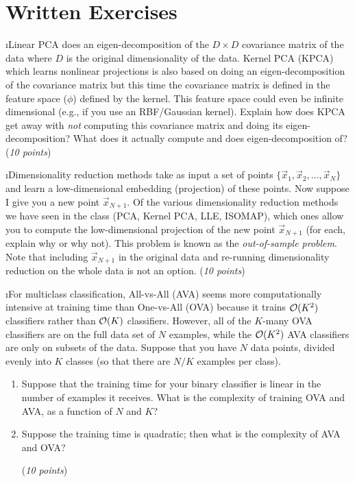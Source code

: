 \documentclass[fleqn]{article}
\begin{document}

\section{Written Exercises}

\bee

\i Linear PCA does an eigen-decomposition of the $D\times D$ covariance
matrix of the data where $D$ is the original dimensionality of the data.
Kernel PCA (KPCA) which learns nonlinear projections is also based on doing an
eigen-decomposition of the covariance matrix but this time the covariance
matrix is defined in the feature space ($\phi$) defined by the kernel. This 
feature space could even be infinite dimensional (e.g., if you use an 
RBF/Gaussian kernel). Explain how does KPCA get away with \emph{not} computing
this covariance matrix and doing its eigen-decomposition? What does it
actually compute and does eigen-decomposition of? (\emph{10 points})

\i Dimensionality reduction methods take as input a set of points
$\{\vec{x}_1,\vec{x}_2,\ldots,\vec{x}_N\}$ and learn a low-dimensional
embedding (projection) of these points. Now suppose I give you a new point
$\vec{x}_{N+1}$. Of the various dimensionality reduction methods we 
have seen in the class (PCA, Kernel PCA, LLE, ISOMAP), which ones 
allow you to compute the low-dimensional projection of the new point
$\vec{x}_{N+1}$ (for each, explain why or why not). This problem is known
as the \emph{out-of-sample problem}. Note that including $\vec{x}_{N+1}$ in the original
data and re-running dimensionality reduction on the whole data is not an option.
(\emph{10 points})

\i For multiclass classification, All-vs-All (AVA) seems more computationally 
intensive at training time than One-vs-All (OVA) because it trains $\mathcal{O}(K^2)$ 
classifiers rather than $\mathcal{O}(K)$ classifiers.  However, all of the $K$-many OVA
classifiers are on the full data set of $N$ examples, while the
$\mathcal{O}(K^2)$ AVA classifiers are only on subsets of the data.  Suppose
that you have $N$ data points, divided evenly into $K$ classes (so
that there are $N/K$ examples per class).

\begin{enumerate}
\item Suppose that the training time for your binary classifier is
  linear in the number of examples it receives.  What is the
  complexity of training OVA and AVA, as a function of $N$ and $K$?


\item Suppose the training time is quadratic; then what is the
  complexity of AVA and OVA?



 (\emph{10 points})

\end{enumerate}
\end{document}
